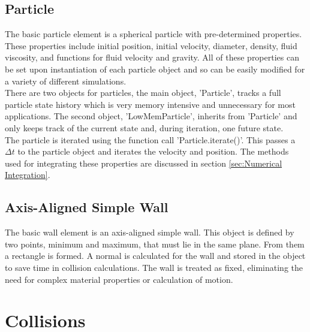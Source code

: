 \documentclass[10pt,a4paper,titlepage]{report}
\begin{document}
\subsection{Particle}
The basic particle element is a spherical particle with pre-determined properties. These properties include initial position, initial velocity, diameter, density, fluid viscosity, and functions for fluid velocity and gravity. All of these properties can be set upon instantiation of each particle object and so can be easily modified for a variety of different simulations.
\\There are two objects for particles, the main object, 'Particle', tracks a full particle state history which is very memory intensive and unnecessary for most applications. The second object, 'LowMemParticle', inherits from 'Particle' and only keeps track of the current state and, during iteration, one future state.
\\The particle is iterated using the function call 'Particle.iterate()'. This passes a $\Delta t$ to the particle object and iterates the velocity and position. The methods used for integrating these properties are discussed in section \ref{sec:Numerical Integration}.
\subsection{Axis-Aligned Simple Wall}
The basic wall element is an axis-aligned simple wall. This object is defined by two points, minimum and maximum, that must lie in the same plane. From them a rectangle is formed. A normal is calculated for the wall and stored in the object to save time in collision calculations. The wall is treated as fixed, eliminating the need for complex material properties or calculation of motion.
\section{Collisions}
\end{document}
